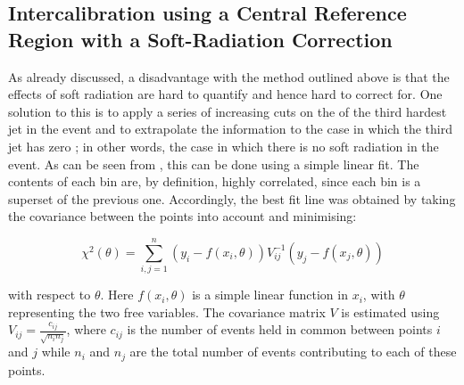 \subsection{Intercalibration using a Central Reference Region with a Soft-Radiation Correction}
As already discussed, a disadvantage with the method outlined above is that the
effects of soft radiation are hard to quantify and hence hard to correct for.
One solution to this is to apply a series of increasing cuts on the \pT of the
third hardest jet in the event and to extrapolate the information to the case in
which the third jet has zero \pT; in other words, the case in which there is no
soft radiation in the event. As can be seen from ,
this can be done using a simple linear fit. The contents of each bin are, by definition,
highly correlated, since each bin is a superset of the previous one. Accordingly,
the best fit line was obtained by taking the covariance between the points into
account and minimising:

\begin{equation}
  \chi^2(\theta) = \sum_{i,j=1}^n \left(y_i - f(x_i, \theta)\right) V^{-1}_{ij} \left(y_j - f(x_j, \theta)\right)
\end{equation}

\noindent with respect to $\theta$. Here $f(x_i,\theta)$ is a simple linear function
in $x_i$, with $\theta$ representing the two free variables. The covariance matrix
$V$ is estimated using $V_{ij} = \frac{c_{ij}}{\sqrt{n_i n_j}}$, where $c_{ij}$ is the number
of events held in common between points $i$ and $j$ while $n_i$ and $n_j$ are the
total number of events contributing to each of these points.


